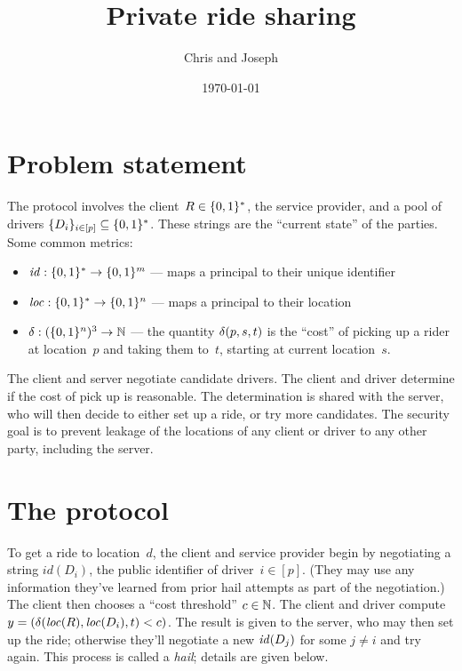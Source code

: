 \documentclass{build/llncs}
\date{\today}
\title{Private ride sharing}
\author{Chris and Joseph}
\institute{}
\begin{document}
\maketitle

\begin{abstract}
  \cptodo{}
\end{abstract}

\section*{Problem statement}

The protocol involves the client~$R\in\{0,1\}^*$, the service provider, and a pool
of drivers $\{D_i\}_{i\in[p]} \subseteq \{0,1\}^*$. These strings are the
``current state'' of the parties. Some common metrics:
\begin{itemize}
   \item $\mathit{id}:\{0,1\}^*\to\{0,1\}^m$ --- maps a principal to their unique identifier
   \item $\mathit{loc}:\{0,1\}^*\to\{0,1\}^n$ --- maps a principal to their location
   \item $\delta : (\{0,1\}^n)^3 \to \mathbb{N}$ --- the quantity $\delta(p, s, t)$ is the ``cost'' of
     picking up a rider at location~$p$ and taking them to~$t$, starting at
     current location~$s$.
\end{itemize}
%
The client and server negotiate candidate drivers. The client and driver
determine if the cost of pick up is reasonable. The determination is shared with
the server, who will then decide to either set up a ride, or try more
candidates.
%
The security goal is to prevent leakage of the locations of any client or driver
to any other party, including the server.


\section*{The protocol}

To get a ride to location~$d$, the client and service provider begin by
negotiating a string $id(D_i)$, the public identifier of driver~$i\in[p]$.
(They may use any information they've learned from prior hail attempts as part
of the negotiation.) The client then chooses a ``cost threshold'' $c\in\mathbb{N}$.
%
The client and driver compute $y = (\delta(\mathit{loc}(R), \mathit{loc}(D_i), t) < c)$. The
result is given to the server, who may then set up the ride; otherwise they'll
negotiate a new $\mathit{id}(D_j)$ for some $j\ne i$ and try again.
%
This process is called a \emph{hail}; details are given below.
\end{document}
